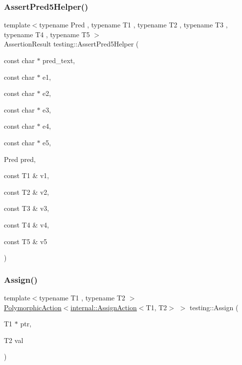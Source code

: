 \mbox{\label{namespacetesting_addcf52b273ce17269cbf4956cfe600a6}} 
\subsubsection{\texorpdfstring{AssertPred5Helper()}{AssertPred5Helper()}}
{\footnotesize\ttfamily template$<$typename Pred , typename T1 , typename T2 , typename T3 , typename T4 , typename T5 $>$ \\
Assertion\+Result testing\+::\+Assert\+Pred5\+Helper (\begin{DoxyParamCaption}\item[{const char $\ast$}]{pred\+\_\+text,  }\item[{const char $\ast$}]{e1,  }\item[{const char $\ast$}]{e2,  }\item[{const char $\ast$}]{e3,  }\item[{const char $\ast$}]{e4,  }\item[{const char $\ast$}]{e5,  }\item[{Pred}]{pred,  }\item[{const T1 \&}]{v1,  }\item[{const T2 \&}]{v2,  }\item[{const T3 \&}]{v3,  }\item[{const T4 \&}]{v4,  }\item[{const T5 \&}]{v5 }\end{DoxyParamCaption})}

\mbox{\label{namespacetesting_abfc4121b8708e8b22a096ff8be88a9d0}} 
\subsubsection{\texorpdfstring{Assign()}{Assign()}}
{\footnotesize\ttfamily template$<$typename T1 , typename T2 $>$ \\
\mbox{\hyperlink{classtesting_1_1PolymorphicAction}{Polymorphic\+Action}}$<$\mbox{\hyperlink{classtesting_1_1internal_1_1AssignAction}{internal\+::\+Assign\+Action}}$<$T1, T2$>$ $>$ testing\+::\+Assign (\begin{DoxyParamCaption}\item[{T1 $\ast$}]{ptr,  }\item[{T2}]{val }\end{DoxyParamCaption})}

